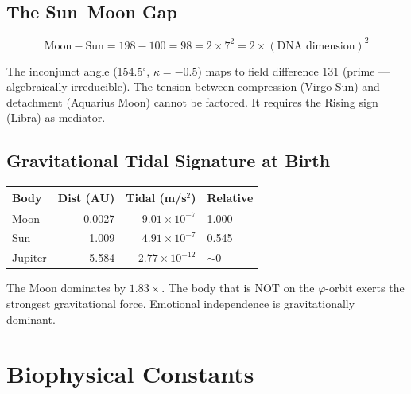 \documentclass[12pt, letterpaper]{article}
\begin{document}
\subsection{The Sun--Moon Gap}

\[
\text{Moon} - \text{Sun} = 198 - 100 = 98 = 2 \times 7^2 = 2 \times (\text{DNA dimension})^2
\]

The inconjunct angle (154.5$^{\circ}$, $\kappa = -0.5$) maps to field difference 131 (prime --- algebraically irreducible). The tension between compression (Virgo Sun) and detachment (Aquarius Moon) cannot be factored. It requires the Rising sign (Libra) as mediator.

\subsection{Gravitational Tidal Signature at Birth}

\begin{center}
\begin{tabular}{lrrl}
\toprule
\textbf{Body} & \textbf{Dist (AU)} & \textbf{Tidal (m/s$^2$)} & \textbf{Relative} \\
\midrule
Moon & 0.0027 & $9.01 \times 10^{-7}$ & 1.000 \\
Sun & 1.009 & $4.91 \times 10^{-7}$ & 0.545 \\
Jupiter & 5.584 & $2.77 \times 10^{-12}$ & $\sim 0$ \\
\bottomrule
\end{tabular}
\end{center}

The Moon dominates by $1.83\times$. The body that is NOT on the $\varphi$-orbit exerts the strongest gravitational force. Emotional independence is gravitationally dominant.

\section{Biophysical Constants}
\end{document}
